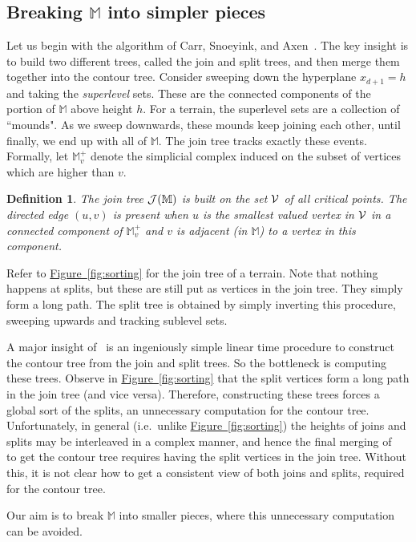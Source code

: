 \documentclass[11pt]{article}
\newtheorem{definition}[theorem]{Definition}
\theoremstyle{definition}
\newcommand{\cJ}{{\cal J}}
\newcommand{\cV}{{\cal V}}
\newcommand{\MM}{\mathbb{M}}
\newcommand{\Fig}[1]{\hyperref[fig:#1]{Figure~\ref*{fig:#1}}} %
\begin{document}
{\subsection{Breaking $\MM$ into simpler pieces} \label{sec:break}
Let us begin with the algorithm of Carr, Snoeyink, and Axen~\cite{csa-cctad-03}. The key insight is to build
two different trees, called the join and split trees, and then merge them together into the contour tree.
Consider sweeping down the hyperplane $x_{d+1} = h$ and taking the \emph{superlevel} sets. These 
are the connected components of the portion of $\MM$ above height $h$. For a terrain, the superlevel
sets are a collection of ``mounds". As we sweep downwards, these mounds keep joining each other,
until finally, we end up with all of $\MM$. The join tree tracks exactly these events. 
Formally, let $\MM^+_v$ denote the simplicial complex induced on the subset of 
vertices which are higher than $v$.

\begin{definition} 
\label{def:int-criticalJoin}
The \emph{join tree} $\cJ(\MM)$ is built on the set $\cV$ of all critical points.
The directed edge $(u,v)$ is present when $u$ is the smallest valued vertex in $\cV$ in a connected component of $\MM^+_v$
and $v$ is adjacent (in $\MM$) to a vertex in this component. 
\end{definition}

Refer to \Fig{sorting} for the join tree of a terrain. Note that nothing happens at splits, but these
are still put as vertices in the join tree. They simply form a long path. The split tree
is obtained by simply inverting this procedure, sweeping upwards and tracking sublevel sets.

A major insight of~\cite{csa-cctad-03} is an ingeniously simple linear time procedure to construct
the contour tree from the join and split trees. So the bottleneck is computing these trees. Observe
in \Fig{sorting} that the split vertices form a long path in the join tree (and vice versa). Therefore, constructing
these trees forces a global sort of the splits, an unnecessary computation for the contour tree. Unfortunately, in general (i.e.\ unlike \Fig{sorting}) 
the heights of joins and splits may be interleaved in a complex manner, and hence the final merging of~\cite{csa-cctad-03}
to get the contour tree requires having the split vertices in the join tree. Without
this, it is not clear how to get a consistent view of both joins and splits, required for the contour tree.

Our aim is to break $\MM$ into smaller pieces, where this unnecessary computation can be avoided.

}
\end{document}
